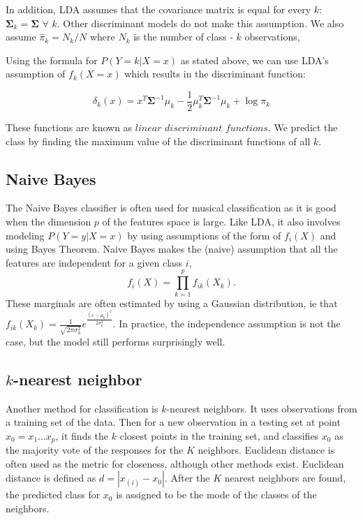 \documentclass[12pt,twoside]{reedthesis}
\theoremstyle{definition}
\theoremstyle{definition}
\theoremstyle{definition}
\theoremstyle{remark}
\begin{document}
In addition, LDA assumes that the covariance matrix is equal for every
\(k\): \(\mathbf{\Sigma}_k = \mathbf{\Sigma}\) \(\forall\) \(k\). Other
discriminant models do not make this assumption. We also assume
\(\hat{\pi}_k = N_k/N\) where \(N_k\) is the number of class - \(k\)
observations,

Using the formula for \(P(Y = k|X=x)\) as stated above, we can use LDA's
assumption of \(f_k(X = x)\) which results in the discriminant function:

\[ \delta_k(x) = x^T\mathbf{\Sigma}^{-1}\mu_k - \frac{1}{2}\mu_k^T\mathbf{\Sigma}^{-1}\mu_k + \log \pi_k \]

These functions are known as \(\textit{linear discriminant functions}\).
We predict the class by finding the maximum value of the discriminant
functions of all \(k\).

\subsection{Naive Bayes}\label{naive-bayes}

The Naive Bayes classifier is often used for musical classification as
it is good when the dimension \(p\) of the features space is large. Like
LDA, it also involves modeling \(P(Y = y | X =x)\) by using assumptions
of the form of \(f_i(X)\) and using Bayes Theorem. Naive Bayes makes the
(naive) assumption that all the features are independent for a given
class \(i\), \[f_i(X) = \prod_{k = 1}^p f_{ik}(X_k).\] These marginals
are often estimated by using a Gaussian distribution, ie that
\(f_{ik}(X_k) = \frac{1}{\sqrt{2\pi\sigma_k^2}}e^{\frac{(x - \mu_k)^2}{2\sigma_k^2}}\).
In practice, the independence assumption is not the case, but the model
still performs surprisingly well.

\subsection{\texorpdfstring{\(k\)-nearest
neighbor}{k-nearest neighbor}}\label{k-nearest-neighbor}

Another method for classification is \(k\)-nearest neighbors. It uses
observations from a training set of the data. Then for a new observation
in a testing set at point \(x_0 = x_1 \ldots x_p\), it finds the \(k\)
closest points in the training set, and classifies \(x_0\) as the
majority vote of the responses for the \(K\) neighbors. Euclidean
distance is often used as the metric for closeness, although other
methods exist. Euclidean distance is defined as \(d = |x_{(i)} - x_0|\).
After the \(K\) nearest neighbors are found, the predicted class for
\(x_0\) is assigned to be the mode of the classes of the neighbors.
\end{document}
